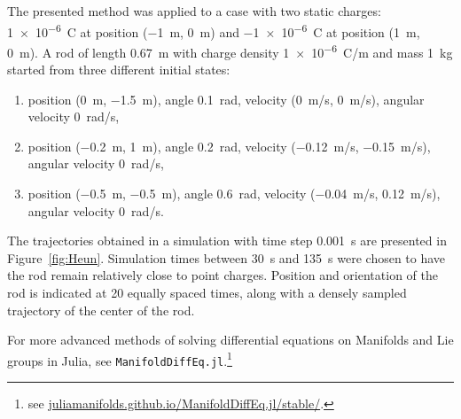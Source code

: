 \documentclass{juliacon}
\begin{document}
The presented method was applied to a case with two static charges: \SI{1e-6}{C} at position (\SI{-1}{m}, \SI{0}{m}) and \SI{-1e-6}{C} at position (\SI{1}{m}, \SI{0}{m}).
A rod of length \SI{0.67}{m} with charge density \SI{1e-6}{C/m} and mass \SI{1}{kg} started from three different initial states:
\begin{enumerate}
    \item position (\SI{0}{m}, \SI{-1.5}{m}), angle \SI{0.1}{rad}, velocity (\SI{0}{m/s}, \SI{0}{m/s}), angular velocity \SI{0}{rad/s},
    \item position (\SI{-0.2}{m}, \SI{1}{m}), angle \SI{0.2}{rad}, velocity (\SI{-0.12}{m/s}, \SI{-0.15}{m/s}), angular velocity \SI{0}{rad/s},
    \item position (\SI{-0.5}{m}, \SI{-0.5}{m}), angle \SI{0.6}{rad}, velocity (\SI{-0.04}{m/s}, \SI{0.12}{m/s}), angular velocity \SI{0}{rad/s}.
\end{enumerate}
The trajectories obtained in a simulation with time step \SI{0.001}{s} are presented in Figure~\ref{fig:Heun}.
Simulation times between \SI{30}{s} and \SI{135}{s} were chosen to have the rod remain relatively close to point charges.
Position and orientation of the rod is indicated at 20 equally spaced times, along with a densely sampled trajectory of the center of the rod.


For more advanced methods of solving differential equations on Manifolds and Lie groups in Julia, see
\verb|ManifoldDiffEq.jl|.\footnote{see \href{https://juliamanifolds.github.io/ManifoldDiffEq.jl/stable/}{juliamanifolds.github.io/ManifoldDiffEq.jl/stable/}.}

 \balance

\end{document}
